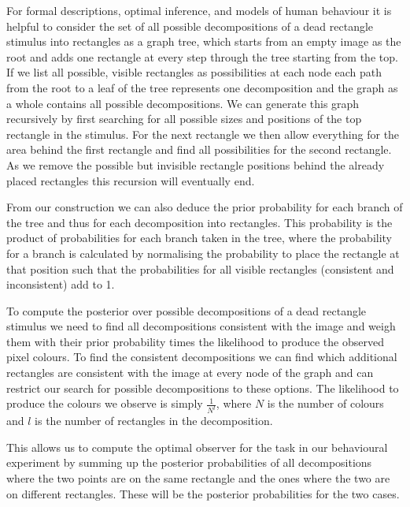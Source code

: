 \documentclass[10pt,letterpaper]{article}
\begin{document}
For formal descriptions, optimal inference, and models of human behaviour it is helpful to consider the set of all possible decompositions of a dead rectangle stimulus into rectangles as a graph tree, which starts from an empty image as the root and adds one rectangle at every step through the tree starting from the top. If we list all possible, visible rectangles as possibilities at each node each path from the root to a leaf of the tree represents one decomposition and the graph as a whole contains all possible decompositions. 
We can generate this graph recursively by first searching for all possible sizes and positions of the top rectangle in the stimulus. For the next rectangle we then allow everything for the area behind the first rectangle and find all possibilities for the second rectangle. As we remove the possible but invisible rectangle positions behind the already placed rectangles this recursion will eventually end. 


From our construction we can also deduce the prior probability for each branch of the tree and thus for each decomposition into rectangles. This probability is the product of probabilities for each branch taken in the tree, where the probability for a branch is calculated by normalising the probability to place the rectangle at that position such that the probabilities for all visible rectangles (consistent and inconsistent) add to 1. 

To compute the posterior over possible decompositions of a dead rectangle stimulus we need to find all decompositions consistent with the image and weigh them with their prior probability times the likelihood to produce the observed pixel colours. To find the consistent decompositions we can find which additional rectangles are consistent with the image at every node of the graph and can restrict our search for possible decompositions to these options. The likelihood to produce the colours we observe is simply $\frac{1}{N^l}$, where $N$ is the number of colours and $l$ is the number of rectangles in the decomposition. 

This allows us to compute the optimal observer for the task in our behavioural experiment by summing up the posterior probabilities of all decompositions where the two points are on the same rectangle and the ones where the two are on different rectangles. These will be the posterior probabilities for the two cases.
\end{document}
